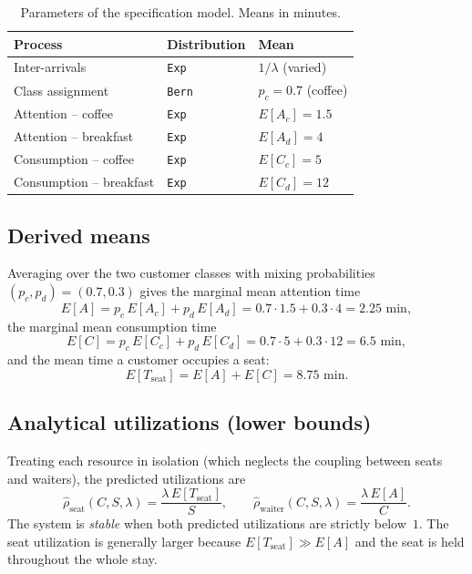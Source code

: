 \documentclass[11pt,a4paper]{article}
\begin{document}
\begin{table}[h]
\centering
\caption{Parameters of the specification model. Means in minutes.}
\label{tab:params}
\begin{tabular}{l l l}
\toprule
Process & Distribution & Mean \\
\midrule
Inter-arrivals          & \texttt{Exp}     & $1/\lambda$ (varied) \\
Class assignment        & \texttt{Bern}    & $p_c = 0.7$ (coffee) \\
Attention -- coffee     & \texttt{Exp}     & $E[A_c] = 1.5$ \\
Attention -- breakfast  & \texttt{Exp}     & $E[A_d] = 4$ \\
Consumption -- coffee   & \texttt{Exp}     & $E[C_c] = 5$ \\
Consumption -- breakfast& \texttt{Exp}     & $E[C_d] = 12$ \\
\bottomrule
\end{tabular}
\end{table}

\subsection{Derived means}
\label{sec:means}

Averaging over the two customer classes with mixing probabilities
$(p_c, p_d) = (0.7, 0.3)$ gives the marginal mean attention time
\begin{equation}
E[A] = p_c\,E[A_c] + p_d\,E[A_d]
     = 0.7\cdot 1.5 + 0.3\cdot 4 = 2.25 \text{ min},
\label{eq:EA}
\end{equation}
the marginal mean consumption time
\begin{equation}
E[C] = p_c\,E[C_c] + p_d\,E[C_d]
     = 0.7\cdot 5 + 0.3\cdot 12 = 6.5 \text{ min},
\label{eq:EC}
\end{equation}
and the mean time a customer occupies a seat:
\begin{equation}
E[T_{\text{seat}}] = E[A] + E[C] = 8.75 \text{ min}.
\label{eq:Eseat}
\end{equation}

\subsection{Analytical utilizations (lower bounds)}
\label{sec:rhopred}

Treating each resource in isolation (which neglects the coupling
between seats and waiters), the predicted utilizations are
\begin{equation}
\hat\rho_{\text{seat}}(C,S,\lambda)
 = \frac{\lambda\,E[T_{\text{seat}}]}{S}, \qquad
\hat\rho_{\text{waiter}}(C,S,\lambda)
 = \frac{\lambda\,E[A]}{C}. \label{eq:rhopred}
\end{equation}
The system is \emph{stable} when both predicted utilizations are
strictly below~$1$. The seat utilization is generally larger because
$E[T_{\text{seat}}] \gg E[A]$ and the seat is held throughout the
whole stay.
\end{document}
